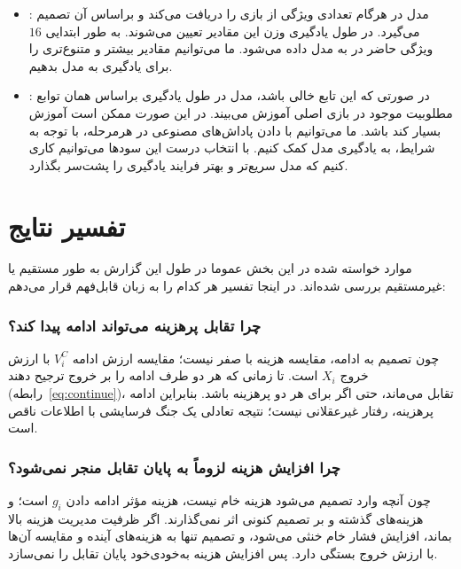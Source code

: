 \documentclass[12pt]{article}
\begin{document}
\begin{itemize}
    \item {}:
    مدل در هرگام تعدادی ویژگی از بازی را دریافت می‌کند و براساس
    آن تصمیم می‌گیرد. در طول یادگیری وزن این مقادیر تعیین می‌شوند. به طور ابتدایی $16$
    ویژگی حاضر در 
    به مدل داده می‌شود. ما می‌توانیم مقادیر بیشتر و متنوع‌تری را برای یادگیری به مدل بدهیم.

    \item {}:
    در صورتی که این تابع خالی باشد، مدل در طول یادگیری براساس همان توابع مطلوبیت
    موجود در بازی اصلی آموزش می‌بیند. در این صورت ممکن است آموزش بسیار کند باشد. ما می‌توانیم با 
    دادن پاداش‌های مصنوعی در هرمرحله، با توجه به شرایط، به یادگیری مدل کمک کنیم. با انتخاب
    درست این سودها می‌توانیم کاری کنیم که مدل سریع‌تر و بهتر فرایند یادگیری را پشت‌سر بگذارد.
\end{itemize}



\section{تفسیر نتایج}

موارد خواسته شده در این بخش عموما در طول این گزارش به 
طور مستقیم یا غیرمستقیم بررسی شده‌اند. در اینجا تفسیر هر کدام را به زبان قابل‌فهم
قرار می‌دهم:

\subsubsection*{چرا تقابل پرهزینه می‌تواند ادامه پیدا کند؟}

چون تصمیم به ادامه، مقایسه هزینه با صفر نیست؛
مقایسه ارزش ادامه $V_i^C$ با ارزش خروج $X_i$ است.
تا زمانی که هر دو طرف ادامه را بر خروج ترجیح دهند (رابطه~\eqref{eq:continue})،
تقابل می‌ماند، حتی اگر برای هر دو پرهزینه باشد.
بنابراین ادامه پرهزینه، رفتار غیرعقلانی نیست؛
نتیجه تعادلی یک جنگ فرسایشی با اطلاعات ناقص است.

\subsubsection*{چرا افزایش هزینه لزوماً به پایان تقابل منجر نمی‌شود؟}

 چون آنچه وارد تصمیم می‌شود هزینه خام نیست، هزینه مؤثر  ادامه دادن
$g_i$ است؛
و هزینه‌های گذشته و بر تصمیم کنونی اثر نمی‌گذارند.
اگر ظرفیت مدیریت هزینه بالا بماند، افزایش فشار خام خنثی می‌شود،
و تصمیم تنها به هزینه‌های آینده و مقایسه آن‌ها با ارزش خروج بستگی دارد.
پس افزایش هزینه به‌خودی‌خود پایان تقابل را نمی‌سازد.
\end{document}
